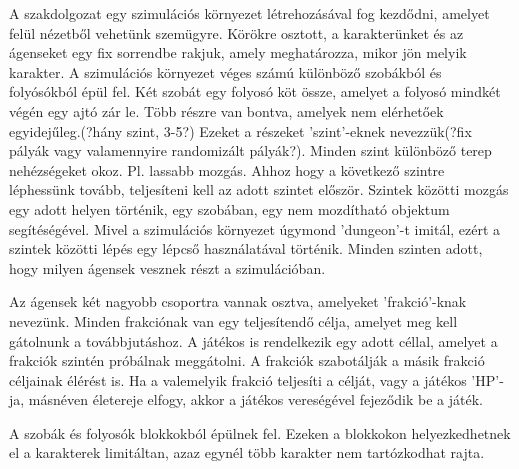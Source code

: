 A szakdolgozat egy szimulációs környezet létrehozásával fog kezdődni, amelyet felül nézetből vehetünk szemügyre.
Körökre osztott, a karakterünket és az ágenseket egy fix sorrendbe rakjuk, amely meghatározza, mikor jön melyik karakter.
A szimulációs környezet véges számú különböző szobákból és folyósókból épül fel. Két szobát egy folyosó köt össze, amelyet a folyosó mindkét végén egy ajtó zár le. Több részre van bontva, amelyek nem elérhetőek egyidejűleg.(?hány szint, 3-5?)
Ezeket a részeket 'szint'-eknek nevezzük(?fix pályák vagy valamennyire randomizált pályák?). Minden szint különböző terep nehézségeket okoz. Pl. lassabb mozgás. Ahhoz hogy a következő szintre léphessünk tovább, teljesíteni kell az adott szintet először.
Szintek közötti mozgás egy adott helyen történik, egy szobában, egy nem mozdítható objektum segítéségével. Mivel a szimulációs környezet úgymond 'dungeon'-t imitál,
ezért a szintek közötti lépés egy lépcső használatával történik. Minden szinten adott, hogy milyen ágensek vesznek részt a szimulációban.

Az ágensek két nagyobb csoportra vannak osztva, amelyeket 'frakció'-knak nevezünk. Minden frakciónak van egy teljesítendő célja, amelyet meg kell gátolnunk a továbbjutáshoz.
A játékos is rendelkezik egy adott céllal, amelyet a frakciók szintén próbálnak meggátolni. A frakciók szabotálják a másik frakció céljainak élérést is.
Ha a valemelyik frakció teljesíti a célját, vagy a játékos 'HP'-ja, másnéven életereje elfogy, akkor a játékos vereségével fejeződik be a játék.

A szobák és folyosók blokkokból épülnek fel. Ezeken a blokkokon helyezkedhetnek el a karakterek limitáltan, azaz egynél több karakter nem tartózkodhat rajta.
